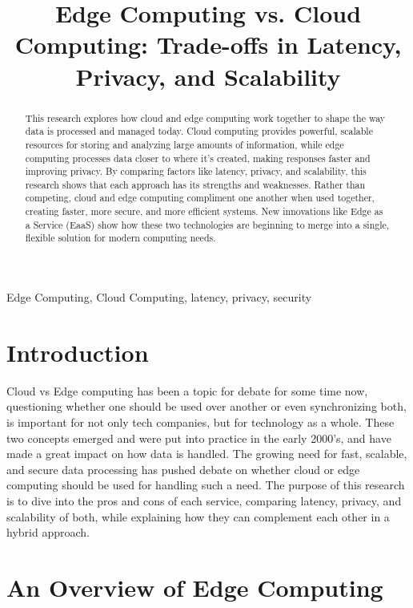 \documentclass[conference]{IEEEtran}
\begin{document}
\title{Edge Computing vs. Cloud Computing: Trade-offs in Latency, Privacy, and Scalability 
}



\maketitle

\begin{abstract}
This research explores how cloud and edge computing work together to shape the way data is processed and managed today. Cloud computing provides powerful, scalable resources for storing and analyzing large amounts of information, while edge computing processes data closer to where it’s created, making responses faster and improving privacy. By comparing factors like latency, privacy, and scalability, this research shows that each approach has its strengths and weaknesses. Rather than competing, cloud and edge computing compliment one another when used together, creating faster, more secure, and more efficient systems. New innovations like Edge as a Service (EaaS) show how these two technologies are beginning to merge into a single, flexible solution for modern computing needs.
\end{abstract}

\begin{IEEEkeywords}
Edge Computing, Cloud Computing, latency, privacy, security
\end{IEEEkeywords}

\section{Introduction}

Cloud vs Edge computing has been a topic for debate for some time now, questioning whether one should be used over another or even synchronizing both, is important for not only tech companies, but for technology as a whole. These two concepts emerged and were put into practice in the early 2000’s, and have made a great impact on how data is handled. The growing need for fast, scalable, and secure data processing has pushed debate on whether cloud or edge computing should be used for handling such a need. The purpose of this research is to dive into the pros and cons of each service, comparing latency, privacy, and scalability of both, while explaining how they can complement each other in a hybrid approach. 

\section{An Overview of Edge Computing}
\end{document}
